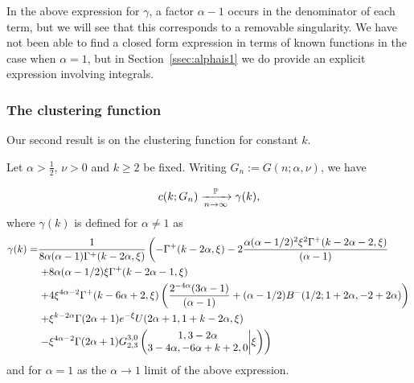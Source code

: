 In the above expression for $\gamma$, a factor $\alpha-1$ occurs in the denominator of each term, but we will see that this
corresponds to a removable singularity. We have not been able to find a closed form expression in terms of known functions in the case when $\alpha=1$, but in Section~\ref{ssec:alphais1} we do provide an explicit expression involving integrals.


\subsubsection{The clustering function}

Our second result is on the clustering function for constant $k$.

\begin{theorem}\label{thm:local_clustering_hyperbolic}\label{thm:mainkfixed}
Let $\alpha > \frac{1}{2}$, $\nu > 0$ and $k\geq2$ be fixed. 
Writing $G_n := G(n;\alpha,\nu)$, we have

\[
	c(k;G_n) \xrightarrow[n\to\infty]{\Pee} \gamma(k),
\]
where $\gamma(k)$ is defined for $\alpha \ne 1$ as 
\begin{align*}
\gamma(k)  =&\frac{1}{8\alpha (\alpha-1)\Gamma^+(k-2\alpha,\xi)} \left( -\Gamma^+(k - 2 \alpha, \xi) - 2\frac{\alpha (\alpha - 1/2)^2 \xi^{2} \Gamma^+(k - 2 \alpha - 2, \xi)}{(\alpha - 1)} \right. \\ 
&\left.+ 8 \alpha (\alpha - 1/2) \xi \Gamma^+(k - 2 \alpha - 1,\xi) \right.\\ 
&\left.+ 4\xi^{4\alpha - 2} \Gamma^+(k - 6 \alpha + 2, 
      \xi) \left( \frac{2^{ - 4\alpha}(3 \alpha - 1)}{(\alpha - 1)} + (\alpha - 1/2) B^-(1/2; 1 + 2 \alpha, -2 + 2 \alpha) \right)  \right.\\ 
&\left.+ \xi^{k-2\alpha} \Gamma(2\alpha+1)e^{-\xi} U(2\alpha+1,1+k-2\alpha,\xi) \right. \\ 
&\left.- \xi^{4\alpha-2} \Gamma(2\alpha+1)\MeijerG{3}{0}{2}{3}{1,3-2\alpha}{3-4\alpha,-6\alpha+k+2,0}{\xi}  \right)
\end{align*}
and for $\alpha = 1$ as the $\alpha\to1$ limit of the above expression.
\end{theorem}

